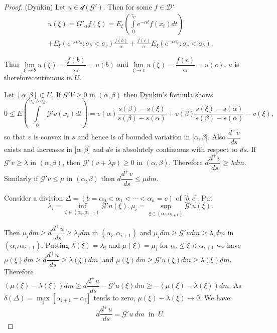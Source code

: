 \begin{proof}(Dynkin)
  Let $u \in \mathscr{d} (\mathscr{G}')$. Then for some $f \in \mathscr{D}'$
  \begin{multline*}
  u(\xi) = G'_\alpha f (\xi) = E _\xi \left(\int\limits^{\tau_U}_{0}
  e^{-\alpha t} f(x_t) dt\right)\\ 
  + E_\xi (e^{-\alpha \sigma_b}: \sigma_b <
  \sigma_c ) \frac{f(b)}{\alpha} + \frac{f (c)} {\alpha} E_\xi
  (e^{-\alpha \tau_c}: \sigma_c < \sigma_b). 
  \end{multline*}
  
  Thus $\lim\limits_{\xi \to b} u(\xi) = \dfrac{f (b)}{\alpha} = u(b)
  $ and $\lim\limits_{\xi \to c} u (\xi) = \dfrac{f (c)}{\alpha} =
  u(c)$. $u$ is therefore\pageoriginale continuous in $\bar{U}$. 
  
  Let $[\alpha , \beta] \subset U$. If $\mathscr{G}' V \geq 0$ in
  $(\alpha , \beta)$ then Dynkin's formula shows 
  $$
  0 \leq E \left(\int\limits^{\sigma_\alpha \wedge \sigma_\beta }_{0}
  \mathscr{G}' v (x_t) dt\right) = v (\alpha) \frac{s (\beta) -s (\xi)}{s
    (\beta) - s (\alpha)} + v (\beta) \frac{s (\xi) - s (\alpha)} {s
    (\beta) - s(\alpha)} - v (\xi), 
  $$
  so that $v$ is convex in $s$ and hence is of bounded variation in
  [$\alpha, \beta$]. Also $\dfrac{d ^+v}{ds}$ exists and increases in
  [$\alpha, \beta$] and $dv$ is absolutely continuous with respect to
  $ds$. If $\mathscr{G}' v \geq \lambda$ in $(\alpha, \beta)$, then
  $\mathscr{G}' (v +\lambda p) \geq 0$ in $(\alpha, \beta)$. Therefore
  $d\dfrac{d^+v}{ds} \geq \lambda dm$. Similarly if $\mathscr{G'}v
  \leq \mu$ in $(\alpha, \beta)$ then $d \dfrac{d^+v}{ds} \leq \mu  dm$.

Consider a division $\Delta = (b = \alpha_0 < \alpha_1 < \cdots <
\alpha_n =c)$ of [$b, c$]. Put  
$$
\lambda_i = \inf\limits_{\xi \in (\alpha_i, \alpha_{i + 1})}
\mathscr{G}' u(\xi), \mu_i = \sup\limits_{\xi \in (\alpha_{i}, \alpha_{i+1})}
\mathscr{G}' u (\xi). 
$$

Then $\mu_i dm \geq d \dfrac{d^+u}{ds} \geq \lambda_i dm $ in
$(\alpha_i, \alpha _{i+1})$ and $\mu_i dm \geq \mathscr{G}' udm \geq
\lambda_i dm$ in $(\alpha_i, \alpha_{i+1})$. Putting $\lambda (\xi) =
\lambda_i$ and $\mu (\xi) = \mu_i$ for $\alpha_i \leq \xi <
\alpha_{i+1}$ we have $ 
\mu (\xi) dm \geq d \dfrac{d^+u}{ds} \geq \lambda (\xi) dm$, and $\mu
(\xi) dm \geq \mathscr{G}' u (\xi) dm \geq \lambda (\xi)
dm$. Therefore $(\mu (\xi) - \lambda (\xi)) dm \geq d \dfrac{d ^+
  u}{ds} - \mathscr{G}' u (\xi) dm \geq - (\mu (\xi)- \lambda (\xi))
dm$. As $\delta (\Delta) = \max\limits_i [\alpha_{i+1}-\alpha_i]$
tends to zero, $\mu (\xi) - \lambda (\xi) \to 0$. We have  
$$
d \frac{d ^+ u}{ds} = \mathscr{G}' u ~ dm ~\text{ \ in \ } ~ U.
$$\pageoriginale


\end{proof}
